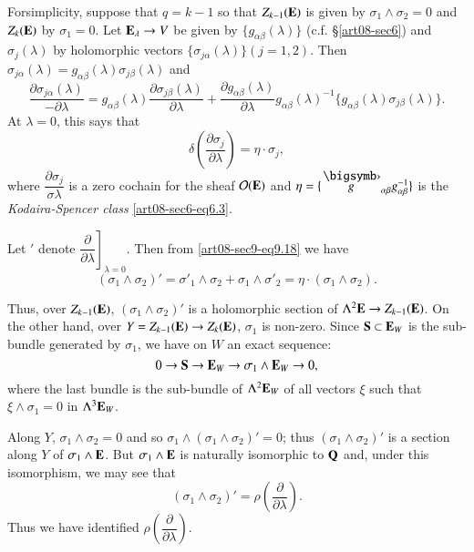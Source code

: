 For\pageoriginale simplicity, suppose that $q=k-1$ so that $Z_{k-1}(\mathbf{E})$ is given by $\sigma_{1}\wedge\sigma_{2}=0$ and $Z_{k}(\mathbf{E})$ by $\sigma_{1}=0$. Let $\mathbf{E}_{\lambda}\to V$ be given by $\{g_{\alpha\beta}(\lambda)\}$ (c.f. \S\ref{art08-sec6}) and $\sigma_{j}(\lambda)$ by holomorphic vectors $\{\sigma_{j\alpha}(\lambda)\}(j=1,2)$. Then $\sigma_{j\alpha}(\lambda)=g_{\alpha\beta}(\lambda)\sigma_{j\beta}(\lambda)$ and
$$
\dfrac{\partial\sigma_{j\alpha}(\lambda)}{-\partial\lambda}=g_{\alpha\beta}(\lambda)\dfrac{\partial\sigma_{j\beta}(\lambda)}{\partial \lambda}+\dfrac{\partial g_{\alpha\beta}(\lambda)}{\partial \lambda}g_{\alpha\beta}(\lambda)^{-1}\{g_{\alpha\beta}(\lambda)\sigma_{j\beta}(\lambda)\}.
$$
At $\lambda=0$, this says that
\begin{equation}
\delta\left(\dfrac{\partial \sigma_{j}}{\partial\lambda}\right)=\eta\cdot \sigma_{j},\label{art08-sec9-eq9.18}
\end{equation}
where $\dfrac{\partial\sigma_{j}}{\sigma\lambda}$ is a zero cochain for the sheaf $\mathcal{O}(\mathbf{E})$ and $\eta=\{\overdot{g}_{\alpha\beta}g^{-1}_{\alpha\beta}\}$ is the {\em Kodaira-Spencer class} \eqref{art08-sec6-eq6.3}.

Let $'$ denote $\left.\dfrac{\partial}{\partial \lambda}\right]_{\lambda=0}$. Then from \eqref{art08-sec9-eq9.18} we have
\begin{equation}
(\sigma_{1}\wedge \sigma_{2})'=\sigma'_{1}\wedge \sigma_{2}+\sigma_{1}\wedge \sigma'_{2}=\eta\cdot (\sigma_{1}\wedge \sigma_{2}).\label{art08-sec9-eq9.19}
\end{equation}

Thus, over $Z_{k-1}(\mathbf{E})$, $(\sigma_{1}\wedge \sigma_{2})'$ is a holomorphic section of $\Lambda^{2}\mathbf{E}\to Z_{k-1}(\mathbf{E})$. On the other hand, over $Y=Z_{k-1}(\mathbf{E})\to Z_{k}(\mathbf{E})$, $\sigma_{1}$ is non-zero. Since $\mathbf{S}\subset \mathbf{E}_{W}$ is the sub-bundle generated by $\sigma_{1}$, we have on $W$ an exact sequence:
\begin{equation}
0\to \mathbf{S}\to \mathbf{E}_{W}\to \sigma_{1}\wedge \mathbf{E}_{W}\to 0,\label{art08-sec9-eq9.20}
\end{equation}
where the last bundle is the sub-bundle of $\Lambda^{2}\mathbf{E}_{W}$ of all vectors $\xi$ such that $\xi\wedge\sigma_{1}=0$ in $\Lambda^{3}\mathbf{E}_{W}$.

Along $Y$, $\sigma_{1}\wedge\sigma_{2}=0$ and so $\sigma_{1}\wedge (\sigma_{1}\wedge\sigma_{2})'=0$; thus $(\sigma_{1}\wedge\sigma_{2})'$ is a section along $Y$ of $\sigma_{1}\wedge\mathbf{E}$. But $\sigma_{1}\wedge\mathbf{E}$ is naturally isomorphic to $\mathbf{Q}$ and, under this isomorphism, we may see that
\begin{equation}
(\sigma_{1}\wedge\sigma_{2})'=\rho\left(\dfrac{\partial}{\partial\lambda}\right).\label{art08-sec9-eq9.21}
\end{equation}
Thus we have identified $\rho\left(\dfrac{\partial}{\partial\lambda}\right)$.

